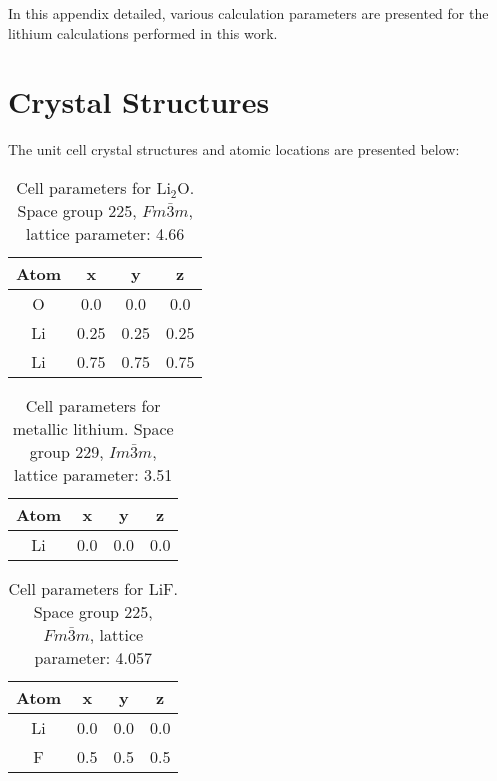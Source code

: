 In this appendix detailed, various calculation parameters are presented for the lithium calculations performed in this work.

\section{Crystal Structures}
The unit cell crystal structures and atomic locations are presented below:

\begin{table}[H]

	\centering
	\caption{Cell parameters for $ \mathrm{Li_2O}$.  Space group 225, $ Fm\bar{3}m $, lattice parameter: 4.66\angstrom }
	\begin{tabular}{cccc}
		Atom	& x	& y	& z				\\
		\hline
		O	& 0.0	&0.0	&0.0	\\
		Li 	& 0.25	&0.25	&0.25	\\
		Li 	& 0.75	&0.75	&0.75	\\
	\end{tabular} 
\end{table}

\begin{table}[H]
	\centering
	\caption{Cell parameters for metallic lithium.  Space group 229, $ Im\bar{3}m $, lattice parameter: 3.51\angstrom }
	\begin{tabular}{cccc}
		Atom	& x	& y	& z				\\
		\hline
		Li	& 0.0	&0.0	&0.0	
	\end{tabular} 
\end{table}


\begin{table}
	\centering
	\caption{Cell parameters for LiF.  Space group 225, $ Fm\bar{3}m $, lattice parameter: 4.057\angstrom }
	\begin{tabular}{cccc}
		Atom	& x	& y	& z				\\
		\hline
		Li	& 0.0	&0.0	&0.0	\\
		F 	& 0.5	&0.5	&0.5	\\
	\end{tabular} 
\end{table}

